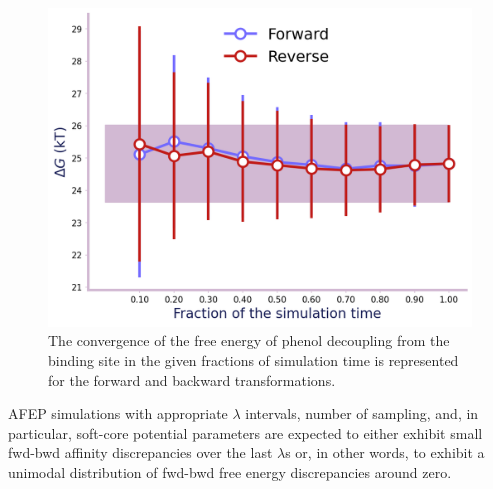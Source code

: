 \documentclass[9pt,tutorial]{livecoms}
\begin{document}
\begin{figure}[h!t]
\centering
\includegraphics[width=0.85\linewidth]{Supp-Files/AFEP-Bound-Decoupling/output/Alchemlyb/output_11_1.png}
\caption{The convergence of the free energy of phenol decoupling from the binding site in the given fractions of simulation time is represented for the forward and backward transformations.}
\label{fig:AFEP-decoupl2}
\end{figure}

AFEP simulations with appropriate {$\lambda$} intervals, number of sampling, and, in particular, soft-core potential parameters are expected to either exhibit small fwd-bwd affinity discrepancies over the last {$\lambda$}s or, in other words, to exhibit a unimodal distribution of fwd-bwd free energy discrepancies around zero.
\end{document}
